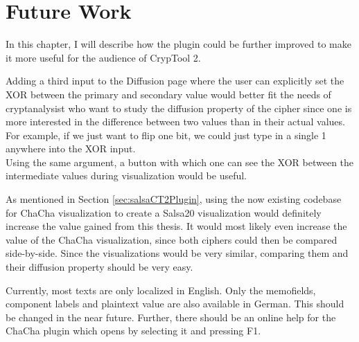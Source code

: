 \chapter{Future Work}
\label{chap:futureWork}

In this chapter, I will describe how the plugin could be further improved to make it more useful for the audience of CrypTool 2.

\begin{description}[style=nextline]
\item[Diffusion: XOR input and button to toggle between XOR and actual values] 

Adding a third input to the Diffusion page where the user can explicitly set the XOR between the primary and secondary value would better fit the needs of cryptanalysist who want to study the diffusion property of the cipher since one is more interested in the difference between two values than in their actual values. For example, if we just want to flip one bit, we could just type in a single 1 anywhere into the XOR input. \\
Using the same argument, a button with which one can see the XOR between the intermediate values during visualization would be useful.

\item[Salsa20 visualization]

As mentioned in Section \ref{sec:salsaCT2Plugin}, using the now existing codebase for ChaCha visualization to create a Salsa20 visualization would definitely increase the value gained from this thesis. It would most likely even increase the value of the ChaCha visualization, since both ciphers could then be compared side-by-side. Since the visualizations would be very similar, comparing them and their diffusion property should be very easy.

\item[Localization and online help]

Currently, most texts are only localized in English. Only the memofields, component labels and plaintext value are also available in German. This should be changed in the near future. Further, there should be an online help for the ChaCha plugin which opens by selecting it and pressing F1.

\end{description}

